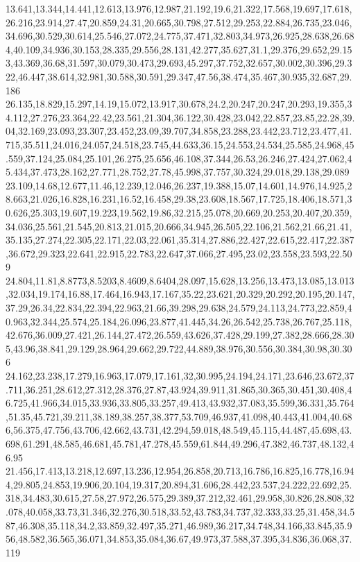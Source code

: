 13.641,13.344,14.441,12.613,13.976,12.987,21.192,19.6,21.322,17.568,19.697,17.618,26.216,23.914,27.47,20.859,24.31,20.665,30.798,27.512,29.253,22.884,26.735,23.046,34.696,30.529,30.614,25.546,27.072,24.775,37.471,32.803,34.973,26.925,28.638,26.684,40.109,34.936,30.153,28.335,29.556,28.131,42.277,35.627,31.1,29.376,29.652,29.153,43.369,36.68,31.597,30.079,30.473,29.693,45.297,37.752,32.657,30.002,30.396,29.322,46.447,38.614,32.981,30.588,30.591,29.347,47.56,38.474,35.467,30.935,32.687,29.186
26.135,18.829,15.297,14.19,15.072,13.917,30.678,24.2,20.247,20.247,20.293,19.355,34.112,27.276,23.364,22.42,23.561,21.304,36.122,30.428,23.042,22.857,23.85,22.28,39.04,32.169,23.093,23.307,23.452,23.09,39.707,34.858,23.288,23.442,23.712,23.477,41.715,35.511,24.016,24.057,24.518,23.745,44.633,36.15,24.553,24.534,25.585,24.968,45.559,37.124,25.084,25.101,26.275,25.656,46.108,37.344,26.53,26.246,27.424,27.062,45.434,37.473,28.162,27.771,28.752,27.78,45.998,37.757,30.324,29.018,29.138,29.089
23.109,14.68,12.677,11.46,12.239,12.046,26.237,19.388,15.07,14.601,14.976,14.925,28.663,21.026,16.828,16.231,16.52,16.458,29.38,23.608,18.567,17.725,18.406,18.571,30.626,25.303,19.607,19.223,19.562,19.86,32.215,25.078,20.669,20.253,20.407,20.359,34.036,25.561,21.545,20.813,21.015,20.666,34.945,26.505,22.106,21.562,21.66,21.41,35.135,27.274,22.305,22.171,22.03,22.061,35.314,27.886,22.427,22.615,22.417,22.387,36.672,29.323,22.641,22.915,22.783,22.647,37.066,27.495,23.02,23.558,23.593,22.509
24.804,11.81,8.8773,8.5203,8.4609,8.6404,28.097,15.628,13.256,13.473,13.085,13.013,32.034,19.174,16.88,17.464,16.943,17.167,35.22,23.621,20.329,20.292,20.195,20.147,37.29,26.34,22.834,22.394,22.963,21.66,39.298,29.638,24.579,24.113,24.773,22.859,40.963,32.344,25.574,25.184,26.096,23.877,41.445,34.26,26.542,25.738,26.767,25.118,42.676,36.009,27.421,26.144,27.472,26.559,43.626,37.428,29.199,27.382,28.666,28.305,43.96,38.841,29.129,28.964,29.662,29.722,44.889,38.976,30.556,30.384,30.98,30.306
24.162,23.238,17.279,16.963,17.079,17.161,32,30.995,24.194,24.171,23.646,23.672,37.711,36.251,28.612,27.312,28.376,27.87,43.924,39.911,31.865,30.365,30.451,30.408,46.725,41.966,34.015,33.936,33.805,33.257,49.413,43.932,37.083,35.599,36.331,35.764,51.35,45.721,39.211,38.189,38.257,38.377,53.709,46.937,41.098,40.443,41.004,40.686,56.375,47.756,43.706,42.662,43.731,42.294,59.018,48.549,45.115,44.487,45.698,43.698,61.291,48.585,46.681,45.781,47.278,45.559,61.844,49.296,47.382,46.737,48.132,46.95
21.456,17.413,13.218,12.697,13.236,12.954,26.858,20.713,16.786,16.825,16.778,16.944,29.805,24.853,19.906,20.104,19.317,20.894,31.606,28.442,23.537,24.222,22.692,25.318,34.483,30.615,27.58,27.972,26.575,29.389,37.212,32.461,29.958,30.826,28.808,32.078,40.058,33.73,31.346,32.276,30.518,33.52,43.783,34.737,32.333,33.25,31.458,34.587,46.308,35.118,34.2,33.859,32.497,35.271,46.989,36.217,34.748,34.166,33.845,35.956,48.582,36.565,36.071,34.853,35.084,36.67,49.973,37.588,37.395,34.836,36.068,37.119
